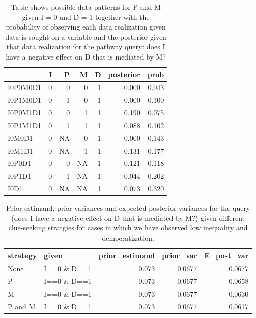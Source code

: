 \documentclass[12pt,]{book}
\begin{document}
\begin{table}[t]

\caption{\label{tab:unnamed-chunk-73}\label{possible_outcomespimd_path} Table shows possible data patterns for P and M given I = 0 and D = 1 together with the probability of observing each data realization given data is sought on a variable and the posterior given that data realization for the pathway query: does I have a negative effect on D that is mediated by M?}
\centering
\begin{tabular}{l|r|r|r|r|r|r}
\hline
  & I & P & M & D & posterior & prob\\
\hline
I0P0M0D1 & 0 & 0 & 0 & 1 & 0.000 & 0.043\\
\hline
I0P1M0D1 & 0 & 1 & 0 & 1 & 0.000 & 0.100\\
\hline
I0P0M1D1 & 0 & 0 & 1 & 1 & 0.190 & 0.075\\
\hline
I0P1M1D1 & 0 & 1 & 1 & 1 & 0.088 & 0.102\\
\hline
I0M0D1 & 0 & NA & 0 & 1 & 0.000 & 0.143\\
\hline
I0M1D1 & 0 & NA & 1 & 1 & 0.131 & 0.177\\
\hline
I0P0D1 & 0 & 0 & NA & 1 & 0.121 & 0.118\\
\hline
I0P1D1 & 0 & 1 & NA & 1 & 0.044 & 0.202\\
\hline
I0D1 & 0 & NA & NA & 1 & 0.073 & 0.320\\
\hline
\end{tabular}
\end{table}

\begin{table}[t]

\caption{\label{tab:unnamed-chunk-74}\label{pimdlearn_path}Prior estimand, prior variances and expected posterior variances for the query (does I have a negative effect on D that is mediated by M?) given different  clue-seeking  stratgies for cases in which we have observed low inequality and democratization.}
\centering
\begin{tabular}{l|l|r|r|r}
\hline
strategy & given & prior\_estimand & prior\_var & E\_post\_var\\
\hline
None & I==0 \& D==1 & 0.073 & 0.0677 & 0.0677\\
\hline
P & I==0 \& D==1 & 0.073 & 0.0677 & 0.0658\\
\hline
M & I==0 \& D==1 & 0.073 & 0.0677 & 0.0630\\
\hline
P and M & I==0 \& D==1 & 0.073 & 0.0677 & 0.0617\\
\hline
\end{tabular}
\end{table}
\end{document}
